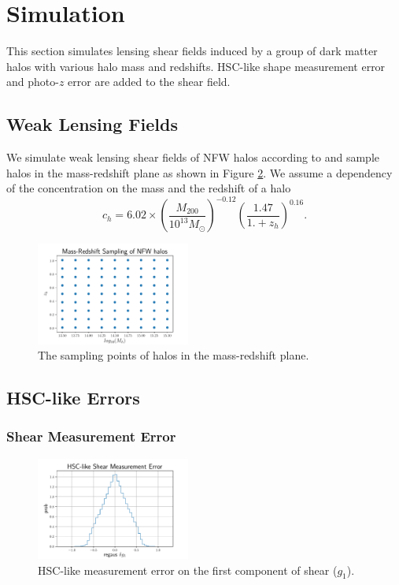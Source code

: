 \documentclass[twocolumn]{aastex62}
\begin{document}
\section{Simulation}
\label{sec:Sim}
This section simulates lensing shear fields induced by a group of dark matter halos with various halo mass and redshifts.
HSC-like shape measurement error and photo-$z$ error are added to the shear field.

\subsection{Weak Lensing Fields}

We simulate weak lensing shear fields of NFW halos according to \citet{haloModel-TJ2003-3pt}
and sample halos in the mass-redshift plane as shown in Figure \ref{fig:mass-redshift}.
We assume a dependency of the concentration on the mass and the redshift of a halo
\begin{equation}
c_{h}=6.02\times(\frac{M_{200}}{10^{13} M_{\odot}})^{-0.12}(\frac{1.47}{1.+z_h})^{0.16}.
\end{equation}


\begin{figure}[!ht]
 \centering
 \includegraphics[width=0.45\textwidth]{mass-redshift-sampling.pdf}
 \caption{The sampling points of halos in the mass-redshift plane.}
 \label{fig:mass-redshift}
\end{figure}

\subsection{HSC-like Errors}
\subsubsection{Shear Measurement Error}
\begin{figure}[!ht]
 \centering
 \includegraphics[width=0.45\textwidth]{shapeMeasurementError-HSCY1.pdf}
 \caption{HSC-like measurement error on the first component of shear ($g_1$).}
 \label{fig:mass-redshift}
\end{figure}
\end{document}
